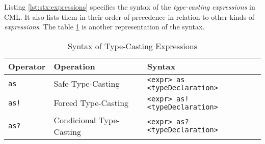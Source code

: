 Listing \ref{lst:stx:expressions} specifies the syntax of
the \emph{type-casting expressions} in CML.
It also lists them in their order of precedence
in relation to other kinds of \emph{expressions}.
The table \ref{tab:type-casting-syntax} is another representation of the syntax.

\begin{table}[H]
\centering
\begin{tabular}
{ l l l }
\hline
Operator & Operation & Syntax \\
\hline
\verb|as| & Safe Type-Casting & \verb|<expr> as <typeDeclaration>| \\
\verb|as!| & Forced Type-Casting & \verb|<expr> as! <typeDeclaration>| \\
\verb|as?| & Condicional Type-Casting & \verb|<expr> as? <typeDeclaration>|
\end{tabular}
\caption{Syntax of Type-Casting Expressions}
\label{tab:type-casting-syntax}
\end{table}
